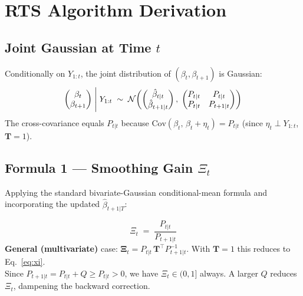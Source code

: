 \documentclass[10pt,a4paper,twocolumn]{article}
\begin{document}
\section{RTS Algorithm Derivation}

\subsection{Joint Gaussian at Time $t$}

Conditionally on $Y_{1:t}$, the joint distribution of
$(\beta_t, \beta_{t+1})$ is Gaussian:
\[
  \begin{pmatrix}\beta_t\\\beta_{t+1}\end{pmatrix}
  \Biggm| Y_{1:t}
  \;\sim\;
  \mathcal{N}\!\left(
    \begin{pmatrix}\hat\beta_{t|t}\\\hat\beta_{t+1|t}\end{pmatrix},\;
    \begin{pmatrix}P_{t|t} & P_{t|t}\\P_{t|t} & P_{t+1|t}\end{pmatrix}
  \right)
\]
The cross-covariance equals $P_{t|t}$ because
$\mathrm{Cov}(\beta_t,\,\beta_t+\eta_t) = P_{t|t}$ (since
$\eta_t \perp Y_{1:t}$, $\mathbf{T}=1$).

\subsection{Formula 1 --- Smoothing Gain $\Xi_t$}

Applying the standard bivariate-Gaussian conditional-mean
formula and incorporating the updated $\hat\beta_{t+1|T}$:

\begin{tcolorbox}[mathbox={Formula 1 --- Smoothing Gain (scalar)}]
\vspace{-4pt}
\begin{equation}\label{eq:xi}
  \boxed{\Xi_t \;=\; \frac{P_{t|t}}{P_{t+1|t}}}
\end{equation}
\vspace{-4pt}
\textbf{General (multivariate)} case:
$\boldsymbol{\Xi}_t = P_{t|t}\,\mathbf{T}^\top P_{t+1|t}^{-1}$.
With $\mathbf{T}=1$ this reduces to Eq.~\eqref{eq:xi}.\\[2pt]
Since $P_{t+1|t} = P_{t|t}+Q \geq P_{t|t} > 0$, we have
$\Xi_t \in (0,1]$ always.  A larger $Q$ reduces $\Xi_t$,
dampening the backward correction.
\end{tcolorbox}
\end{document}
